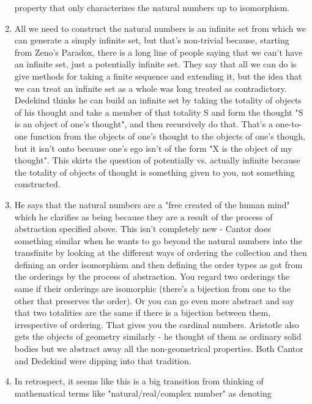 \documentclass[12pt]{article}
\theoremstyle{definition}
\begin{document}
\begin{enumerate}
        property that only characterizes the natural numbers up to isomorphism.
    \item
        All we need to construct the natural numbers is an infinite set from
        which we can generate a simply infinite set, but that's non-trivial
        because, starting from Zeno's Paradox, there is a long line of people
        saying that we can't have an infinite set, just a potentially infinite
        set. They say that all we can do is give methods for taking a finite
        sequence and extending it, but the idea that we can treat an infinite
        set as a whole was long treated as contradictory. Dedekind thinks he
        can build an infinite set by taking the totality of objects of his
        thought and take a member of that totality S and form the thought "S is
        an object of one's thought", and then recursively do that. That's a
        one-to-one function from the objects of one's thought to the objects of
        one's though, but it isn't onto because one's ego isn't of the form "X
        is the object of my thought". This skirts the question of potentially
        vs. actually infinite because the totality of objects of thought is
        something given to you, not something constructed.
    \item 
        He says that the natural numbers are a "free created of the human mind"
        which he clarifies as being because they are a result of the process of
        abstraction specified above. This isn't completely new - Cantor does
        something similar when he wants to go beyond the natural numbers into
        the transfinite by looking at the different ways of ordering the
        collection and then defining an order isomorphism and then defining the
        order types as got from the orderings by the process of abstraction.
        You regard two orderings the same if their orderings are isomorphic
        (there's a bijection from one to the other that preserves the order).
        Or you can go even more abstract and say that two totalities are the
        same if there is a bijection between them, irrespective of ordering.
        That gives you the cardinal numbers. Aristotle also gets the objects of
        geometry similarly - he thought of them as ordinary solid bodies but we
        abstract away all the non-geometrical properties. Both Cantor and
        Dedekind were dipping into that tradition.
    \item
        In retrospect, it seems like this is a big transition from thinking of
        mathematical terms like "natural/real/complex number" as denoting

\end{enumerate}
\end{document}

